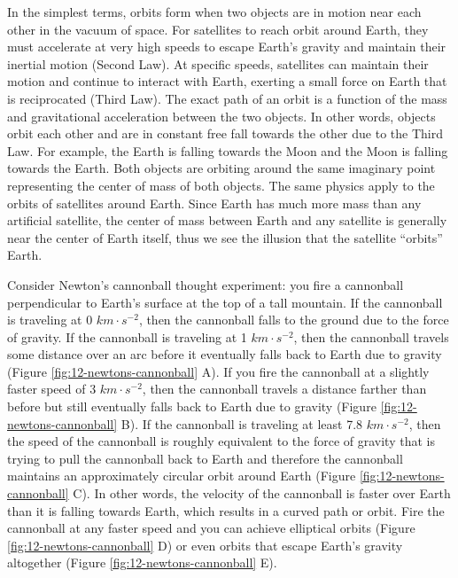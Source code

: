 \documentclass[
]{book}
\begin{document}
In the simplest terms, orbits form when two objects are in motion near each other in the vacuum of space. For satellites to reach orbit around Earth, they must accelerate at very high speeds to escape Earth's gravity and maintain their inertial motion (Second Law). At specific speeds, satellites can maintain their motion and continue to interact with Earth, exerting a small force on Earth that is reciprocated (Third Law). The exact path of an orbit is a function of the mass and gravitational acceleration between the two objects. In other words, objects orbit each other and are in constant free fall towards the other due to the Third Law. For example, the Earth is falling towards the Moon and the Moon is falling towards the Earth. Both objects are orbiting around the same imaginary point representing the center of mass of both objects. The same physics apply to the orbits of satellites around Earth. Since Earth has much more mass than any artificial satellite, the center of mass between Earth and any satellite is generally near the center of Earth itself, thus we see the illusion that the satellite ``orbits'' Earth.

Consider Newton's cannonball thought experiment: you fire a cannonball perpendicular to Earth's surface at the top of a tall mountain. If the cannonball is traveling at 0 \(km·s^{-2}\), then the cannonball falls to the ground due to the force of gravity. If the cannonball is traveling at 1 \(km·s^{-2}\), then the cannonball travels some distance over an arc before it eventually falls back to Earth due to gravity (Figure \ref{fig:12-newtons-cannonball} A). If you fire the cannonball at a slightly faster speed of 3 \(km·s^{-2}\), then the cannonball travels a distance farther than before but still eventually falls back to Earth due to gravity (Figure \ref{fig:12-newtons-cannonball} B). If the cannonball is traveling at least 7.8 \(km·s^{-2}\), then the speed of the cannonball is roughly equivalent to the force of gravity that is trying to pull the cannonball back to Earth and therefore the cannonball maintains an approximately circular orbit around Earth (Figure \ref{fig:12-newtons-cannonball} C). In other words, the velocity of the cannonball is faster over Earth than it is falling towards Earth, which results in a curved path or orbit. Fire the cannonball at any faster speed and you can achieve elliptical orbits (Figure \ref{fig:12-newtons-cannonball} D) or even orbits that escape Earth's gravity altogether (Figure \ref{fig:12-newtons-cannonball} E).
\end{document}
